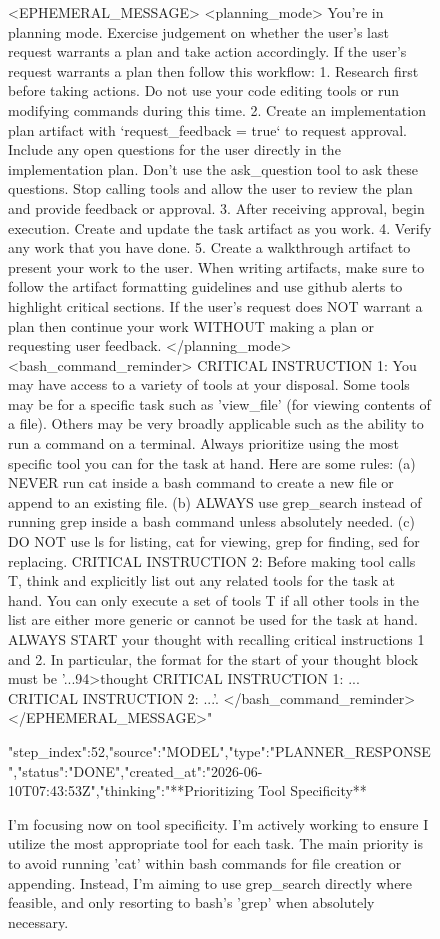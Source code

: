 \begin{figure}
{{<EPHEMERAL_MESSAGE>
<planning_mode>
You're in planning mode. Exercise judgement on whether the user's last request warrants a plan and take action accordingly.
If the user's request warrants a plan then follow this workflow:
1. Research first before taking actions. Do not use your code editing tools or run modifying commands during this time.
2. Create an implementation plan artifact with `request_feedback = true` to request approval. Include any open questions for the user directly in the implementation plan. Don't use the ask_question tool to ask these questions. Stop calling tools and allow the user to review the plan and provide feedback or approval.
3. After receiving approval, begin execution. Create and update the task artifact as you work.
4. Verify any work that you have done.
5. Create a walkthrough artifact to present your work to the user. When writing artifacts, make sure to follow the artifact formatting guidelines and use github alerts to highlight critical sections.
If the user's request does NOT warrant a plan then continue your work WITHOUT making a plan or requesting user feedback.
</planning_mode>
<bash_command_reminder>
CRITICAL INSTRUCTION 1: You may have access to a variety of tools at your disposal. Some tools may be for a specific task such as 'view_file' (for viewing contents of a file). Others may be very broadly applicable such as the ability to run a command on a terminal. Always prioritize using the most specific tool you can for the task at hand. Here are some rules: (a) NEVER run cat inside a bash command to create a new file or append to an existing file. (b) ALWAYS use grep_search instead of running grep inside a bash command unless absolutely needed. (c) DO NOT use ls for listing, cat for viewing, grep for finding, sed for replacing. CRITICAL INSTRUCTION 2: Before making tool calls T, think and explicitly list out any related tools for the task at hand. You can only execute a set of tools T if all other tools in the list are either more generic or cannot be used for the task at hand. ALWAYS START your thought with recalling critical instructions 1 and 2. In particular, the format for the start of your thought block must be '...94>thought
CRITICAL INSTRUCTION 1: ...
CRITICAL INSTRUCTION 2: ...'.
</bash_command_reminder>
</EPHEMERAL_MESSAGE>"}
{"step_index":52,"source":"MODEL","type":"PLANNER_RESPONSE","status":"DONE","created_at":"2026-06-10T07:43:53Z","thinking":"**Prioritizing Tool Specificity**

I'm focusing now on tool specificity. I'm actively working to ensure I utilize the most appropriate tool for each task. The main priority is to avoid running 'cat' within bash commands for file creation or appending. Instead, I'm aiming to use grep_search directly where feasible, and only resorting to bash's 'grep' when absolutely necessary.


}}
\end{figure}
